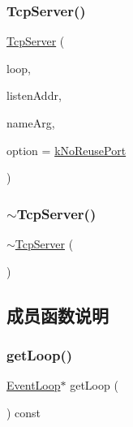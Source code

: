 \subsubsection{\texorpdfstring{Tcp\+Server()}{TcpServer()}}
{\footnotesize\ttfamily \hyperlink{classmuduo_1_1net_1_1TcpServer}{Tcp\+Server} (\begin{DoxyParamCaption}\item[{\hyperlink{classmuduo_1_1net_1_1EventLoop}{Event\+Loop} $\ast$}]{loop,  }\item[{const \hyperlink{classmuduo_1_1net_1_1InetAddress}{Inet\+Address} \&}]{listen\+Addr,  }\item[{const string \&}]{name\+Arg,  }\item[{\hyperlink{classmuduo_1_1net_1_1TcpServer_a0e65ad13124ea2cb5e255b640464e35f}{Option}}]{option = {\ttfamily \hyperlink{classmuduo_1_1net_1_1TcpServer_a0e65ad13124ea2cb5e255b640464e35fa5ddf56db99b3883a1c729e8b6873bbf5}{k\+No\+Reuse\+Port}} }\end{DoxyParamCaption})}

\mbox{\label{classmuduo_1_1net_1_1TcpServer_a4eb415b51f7d85a5d4ac91370d0cbb00}} 
\subsubsection{\texorpdfstring{$\sim$\+Tcp\+Server()}{~TcpServer()}}
{\footnotesize\ttfamily $\sim$\hyperlink{classmuduo_1_1net_1_1TcpServer}{Tcp\+Server} (\begin{DoxyParamCaption}{ }\end{DoxyParamCaption})}



\subsection{成员函数说明}
\mbox{\label{classmuduo_1_1net_1_1TcpServer_aef1cbfe0592e8196e6c81b4db82a39ce}} 
\subsubsection{\texorpdfstring{get\+Loop()}{getLoop()}}
{\footnotesize\ttfamily \hyperlink{classmuduo_1_1net_1_1EventLoop}{Event\+Loop}$\ast$ get\+Loop (\begin{DoxyParamCaption}{ }\end{DoxyParamCaption}) const\hspace{0.3cm}{\ttfamily [inline]}}



